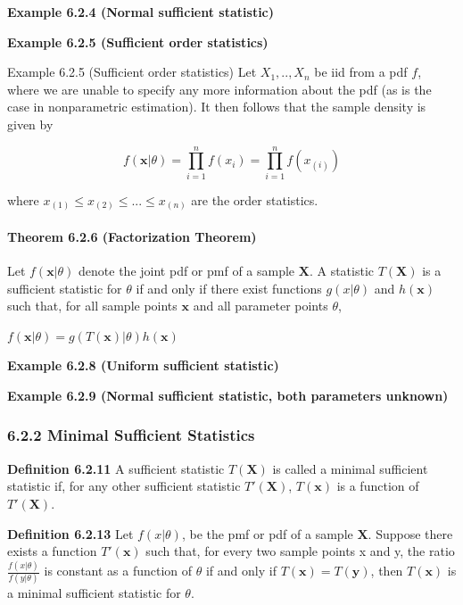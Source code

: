 \documentclass[6pt,Portrait]{article}
\let\oldparagraph\paragraph
\renewcommand{\paragraph}[1]{\oldparagraph{#1}\mbox{}}
\begin{document}
\textbf{Example 6.2.4 (Normal sufficient statistic)}

\textbf{Example 6.2.5 (Sufficient order statistics)}

Example 6.2.5 (Sufficient order statistics) Let \(X_1,..,X_n\) be iid
from a pdf \(f\), where we are unable to specify any more information
about the pdf (as is the case in nonparametric estimation). It then
follows that the sample density is given by

\[f(\mathbf{x}|\theta)=\prod_{i=1}^nf(x_i)=\prod_{i=1}^nf(x_{(i)})\]

where \(x_{(1)}\le x_{(2)}\le...\le x_{(n)}\) are the order statistics.

\hypertarget{Facto}{%
\paragraph{\texorpdfstring{\textbf{Theorem 6.2.6 (Factorization
Theorem)}}{Theorem 6.2.6 (Factorization Theorem)}}\label{Facto}}

Let \(f(\mathbf{x}|\theta)\) denote the joint pdf or pmf of a sample
\(\mathbf{X}\). A statistic \(T(\mathbf{X})\) is a sufficient statistic
for \(\theta\) if and only if there exist functions \(g(x|\theta)\) and
\(h(\mathbf{x})\) such that, for all sample points \(\mathbf{x}\) and
all parameter points \(\theta\),

\(f(\mathbf{x}|\theta)= g(T(\mathbf{x})|\theta)h(\mathbf{x})\)

\textbf{Example 6.2.8 (Uniform sufficient statistic)}

\textbf{Example 6.2.9 (Normal sufficient statistic, both parameters
unknown)}

\hypertarget{minimal-sufficient-statistics}{%
\subsubsection{6.2.2 Minimal Sufficient
Statistics}\label{minimal-sufficient-statistics}}

\textbf{Definition 6.2.11} A sufficient statistic \(T(\mathbf{X})\) is
called a minimal sufficient statistic if, for any other sufficient
statistic \(T'(\mathbf{X})\), \(T(\mathbf{x})\) is a function of
\(T'(\mathbf{X})\).

\textbf{Definition 6.2.13} Let \(f(x|\theta)\), be the pmf or pdf of a
sample \(\mathbf{X}\). Suppose there exists a function
\(T'(\mathbf{x})\) such that, for every two sample points x and y, the
ratio \(\frac{f(x|\theta)}{f(y|\theta)}\) is constant as a function of
\(\theta\) if and only if \(T(\mathbf{x})=T(\mathbf{y})\), then
\(T(\mathbf{x})\) is a minimal sufficient statistic for \(\theta\).
\end{document}
